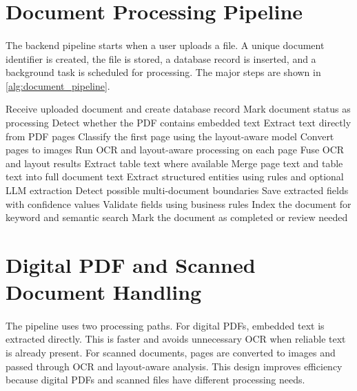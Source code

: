 \section{Document Processing Pipeline}
\paragraph{} The backend pipeline starts when a user uploads a file. A unique document identifier is created, the file is stored, a database record is inserted, and a background task is scheduled for processing. The major steps are shown in \cref{alg:document_pipeline}.

\begin{algorithm}[h]
\caption{Document Processing Pipeline}
\label{alg:document_pipeline}
\begin{algorithmic}[1]
\State Receive uploaded document and create database record
\State Mark document status as processing
\State Detect whether the PDF contains embedded text
    \State Extract text directly from PDF pages
    \State Classify the first page using the layout-aware model
\Else
    \State Convert pages to images
    \State Run OCR and layout-aware processing on each page
    \State Fuse OCR and layout results
\EndIf
\State Extract table text where available
\State Merge page text and table text into full document text
\State Extract structured entities using rules and optional LLM extraction
\State Detect possible multi-document boundaries
\State Save extracted fields with confidence values
\State Validate fields using business rules
\State Index the document for keyword and semantic search
\State Mark the document as completed or review needed
\end{algorithmic}
\end{algorithm}

\section{Digital PDF and Scanned Document Handling}
\paragraph{} The pipeline uses two processing paths. For digital PDFs, embedded text is extracted directly. This is faster and avoids unnecessary OCR when reliable text is already present. For scanned documents, pages are converted to images and passed through OCR and layout-aware analysis. This design improves efficiency because digital PDFs and scanned files have different processing needs.

